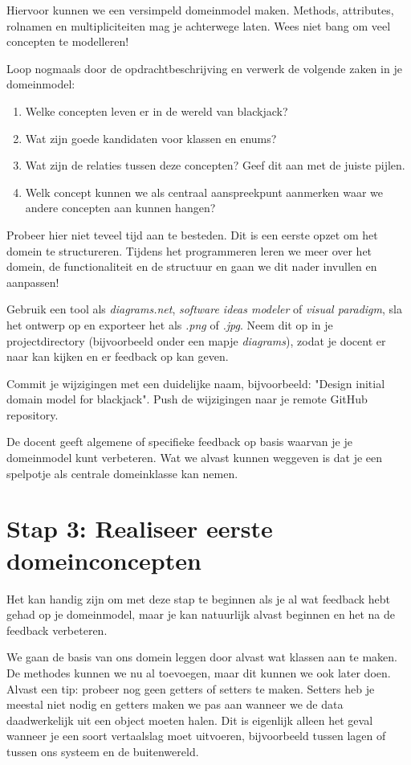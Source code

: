 \documentclass[dutch,a4paper,12pt,doubleside]{book}
\begin{document}
Hiervoor kunnen we een versimpeld domeinmodel maken. 
Methods, attributes, rolnamen en multipliciteiten mag je achterwege laten.
Wees niet bang om veel concepten te modelleren!

Loop nogmaals door de opdrachtbeschrijving en verwerk de volgende zaken in je 
domeinmodel:
\begin{enumerate}
    \item Welke concepten leven er in de wereld van blackjack? 
    \item Wat zijn goede kandidaten voor klassen en enums?
    \item Wat zijn de relaties tussen deze concepten? Geef dit aan met de juiste pijlen.
    \item Welk concept kunnen we als centraal aanspreekpunt aanmerken waar we andere concepten aan kunnen hangen?
\end{enumerate}

Probeer hier niet teveel tijd aan te besteden.
Dit is een eerste opzet om het domein te structureren.
Tijdens het programmeren leren we meer over het domein, de functionaliteit en de structuur
en gaan we dit nader invullen en aanpassen!

Gebruik een tool als \textit{diagrams.net}, \textit{software ideas modeler} of \textit{visual paradigm},
sla het ontwerp op en exporteer het als \textit{.png} of \textit{.jpg}. 
Neem dit op in je projectdirectory (bijvoorbeeld onder een mapje \textit{diagrams}),
zodat je docent er naar kan kijken en er feedback op kan geven.

Commit je wijzigingen met een duidelijke naam, 
bijvoorbeeld: "Design initial domain model for blackjack". 
Push de wijzigingen naar je remote GitHub repository.

De docent geeft algemene of specifieke feedback
op basis waarvan je je domeinmodel kunt verbeteren.
Wat we alvast kunnen weggeven is dat je een spelpotje 
als centrale domeinklasse kan nemen.

\newpage
\section{Stap 3: Realiseer eerste domeinconcepten}
Het kan handig zijn om met deze stap te beginnen als je al wat feedback hebt 
gehad op je domeinmodel, maar je kan natuurlijk alvast beginnen en het na 
de feedback verbeteren.

We gaan de basis van ons domein leggen door alvast wat klassen aan te maken.
De methodes kunnen we nu al toevoegen, maar dit kunnen we ook later doen. 
Alvast een tip: probeer nog geen getters of setters te maken. 
Setters heb je meestal niet nodig en getters maken we pas aan wanneer
we de data daadwerkelijk uit een object moeten halen. Dit is eigenlijk alleen 
het geval wanneer je een soort vertaalslag moet uitvoeren, bijvoorbeeld tussen 
lagen of tussen ons systeem en de buitenwereld.
\end{document}
